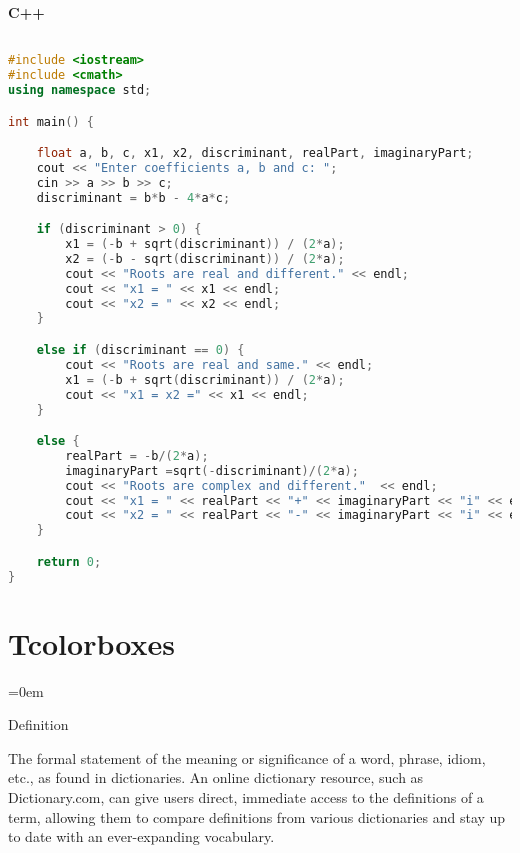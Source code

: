 \lipsum[1]

\textbf{C++}
\begin{lstlisting}[language=C++]

#include <iostream>
#include <cmath>
using namespace std;

int main() {

	float a, b, c, x1, x2, discriminant, realPart, imaginaryPart;
	cout << "Enter coefficients a, b and c: ";
	cin >> a >> b >> c;
	discriminant = b*b - 4*a*c;

	if (discriminant > 0) {
		x1 = (-b + sqrt(discriminant)) / (2*a);
		x2 = (-b - sqrt(discriminant)) / (2*a);
		cout << "Roots are real and different." << endl;
		cout << "x1 = " << x1 << endl;
		cout << "x2 = " << x2 << endl;
	}

	else if (discriminant == 0) {
		cout << "Roots are real and same." << endl;
		x1 = (-b + sqrt(discriminant)) / (2*a);
		cout << "x1 = x2 =" << x1 << endl;
	}

	else {
		realPart = -b/(2*a);
		imaginaryPart =sqrt(-discriminant)/(2*a);
		cout << "Roots are complex and different."  << endl;
		cout << "x1 = " << realPart << "+" << imaginaryPart << "i" << endl;
		cout << "x2 = " << realPart << "-" << imaginaryPart << "i" << endl;
	}

	return 0;
}


\end{lstlisting}


\lipsum[1]


\sectionend

\section{Tcolorboxes}
\label{sec:tcolorboxes}

\parindent=0em

\tcolorboxdefinition
{Definition}
{\label{def:definition}}
{

The formal statement of the meaning or significance of a word, phrase, idiom, etc., as found in dictionaries. An online dictionary resource, such as Dictionary.com, can give users direct, immediate access to the definitions of a term, allowing them to compare definitions from various dictionaries and stay up to date with an ever-expanding vocabulary.


}


\lipsum[1]


